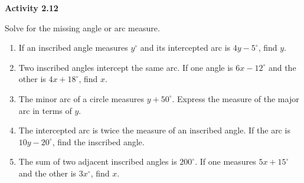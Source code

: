 \vspace{0.3ex}
\noindent\textbf{Activity 2.12}

\vspace{0.2ex}

Solve for the missing angle or arc measure.

\begin{enumerate}
    \item If an inscribed angle measures $y^\circ$ and its intercepted arc is $4y - 5^\circ$, find $y$.
    \item Two inscribed angles intercept the same arc. If one angle is $6x - 12^\circ$ and the other is $4x + 18^\circ$, find $x$.
    \item The minor arc of a circle measures $y + 50^\circ$. Express the measure of the major arc in terms of $y$.
    \item The intercepted arc is twice the measure of an inscribed angle. If the arc is $10y - 20^\circ$, find the inscribed angle.
    \item The sum of two adjacent inscribed angles is $200^\circ$. If one measures $5x + 15^\circ$ and the other is $3x^\circ$, find $x$.
\end{enumerate}
